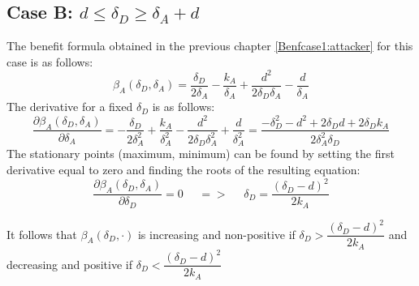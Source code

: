 \subsection*{Case B: $d \leq \delta_{D} \geq \delta_{A} + d$}

The benefit formula obtained in the previous chapter \ref{Benfcase1:attacker} for this case is as follows:
\begin{equation*}
\beta_{A}(\delta_{D},\delta_{A}) =\dfrac{\delta_{D}}{2\delta_{A}} - \dfrac{k_{A}}{\delta_{A}} + \dfrac{d^{2}}{2\delta_{D}\delta_{A}} - \dfrac{d}{\delta_{A}}
\end{equation*}
The derivative for a fixed $\delta_{D}$ is as follows:
\begin{equation*}
\dfrac{\partial \beta_{A}(\delta_{D},\delta_{A})}{\partial \delta_{A}} = -\dfrac{\delta_{D}}{2\delta_{A}^{2}} + \dfrac{k_{A}}{\delta_{A}^{2}} - \dfrac{d^{2}}{2\delta_{D}\delta_{A}^{2}} + \dfrac{d}{\delta_{A}^{2}} = \dfrac{-\delta_{D}^{2} - d^{2} + 2\delta_{D}d + 2\delta_{D}k_{A}}{2\delta_{A}^{2}\delta_{D}}
\end{equation*}
The stationary points (maximum, minimum) can be found by setting the first derivative equal to zero and finding the roots of the resulting equation:
\begin{equation*}
\frac{\partial \beta_{A}(\delta_{D},\delta_{A})}{\partial \delta_{D}} =0 ~~~~~~ =>~~~~~~  \delta_{D}= \dfrac{(\delta_{D}-d)^{2}}{2k_{A}}
\end{equation*}

It follows that $\beta_{A}(\delta_{D},\cdot)$ is increasing and non-positive if $\delta_{D}> \dfrac{(\delta_{D}-d)^{2}}{2k_{A}}$ and decreasing and positive if $\delta_{D} < \dfrac{(\delta_{D}-d)^{2}}{2k_{A}}$  \\

